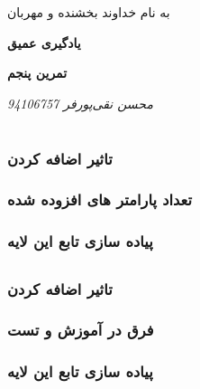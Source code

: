 \documentclass{article}
\begin{document}
\begin{titlepage}
	\centering
	{\scshape\LARGE به نام خداوند بخشنده و مهربان \par}
	\vspace{2cm}
	{\huge\bfseries یادگیری عمیق\par}
	\vspace{3cm}
	{\Large\bfseries  تمرین پنجم \par}
	\vspace{3cm}
	{\Large\itshape 		محسن نقی‌پورفر		94106757\par}
	\vspace{0.25cm}
	\vfill
	\end{titlepage}

\section{}
\subsection{}
\subsubsection{تاثیر اضافه کردن }
\subsubsection{تعداد پارامتر های افزوده شده}
\subsubsection{پیاده سازی تابع این لایه}
\subsection{}
\subsubsection{تاثیر اضافه کردن }
\subsubsection{فرق در آموزش و تست}
\subsubsection{پیاده سازی تابع این لایه}
\section{}
\end{document}
